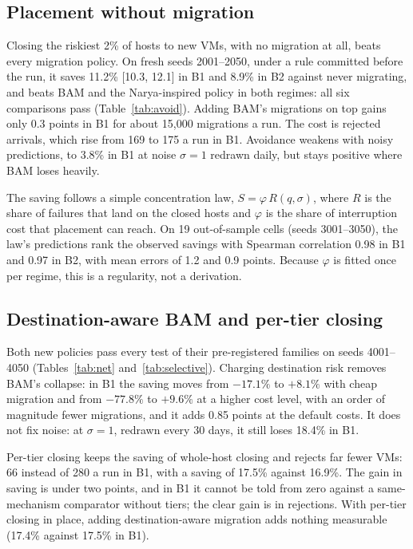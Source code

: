 \documentclass[pdflatex,sn-mathphys-num,iicol]{sn-jnl}
\theoremstyle{thmstyleone}%
\theoremstyle{thmstylethree}%
\begin{document}


\subsection{Placement without migration}\label{sec:res-avoid}

Closing the riskiest 2\% of hosts to new VMs, with no migration at all, beats every migration
policy. On fresh seeds 2001--2050, under a rule committed before the run, it saves 11.2\%
[10.3, 12.1] in B1 and 8.9\% in B2 against never migrating, and beats BAM and the Narya-inspired
policy in both regimes: all six comparisons pass (Table~\ref{tab:avoid}). Adding BAM's migrations
on top gains only 0.3 points in B1 for about 15{,}000 migrations a run. The cost is rejected
arrivals, which rise from 169 to 175 a run in B1. Avoidance weakens with noisy predictions, to
3.8\% in B1 at noise $\sigma = 1$ redrawn daily, but stays positive where BAM loses heavily.

The saving follows a simple concentration law, $S = \varphi\, R(q, \sigma)$, where $R$ is the share of
failures that land on the closed hosts and $\varphi$ is the share of interruption cost that placement
can reach. On 19 out-of-sample cells (seeds 3001--3050), the law's predictions rank the observed
savings with Spearman correlation 0.98 in B1 and 0.97 in B2, with mean errors of 1.2 and 0.9
points. Because $\varphi$ is fitted once per regime, this is a regularity, not a derivation.



\subsection{Destination-aware BAM and per-tier closing}\label{sec:res-new}

Both new policies pass every test of their pre-registered families on seeds 4001--4050
(Tables~\ref{tab:net} and~\ref{tab:selective}). Charging destination risk removes BAM's collapse:
in B1 the saving moves from $-17.1\%$ to $+8.1\%$ with cheap migration and from $-77.8\%$ to
$+9.6\%$ at a higher cost level, with an order of magnitude fewer migrations, and it adds
0.85 points at the default costs. It does not fix noise: at $\sigma = 1$, redrawn every 30 days, it
still loses 18.4\% in B1.

Per-tier closing keeps the saving of whole-host closing and rejects far fewer VMs: 66 instead of
280 a run in B1, with a saving of 17.5\% against 16.9\%. The gain in saving is under two points, and
in B1 it cannot be told from zero against a same-mechanism comparator without tiers; the clear gain
is in rejections. With per-tier closing in place, adding destination-aware migration adds nothing
measurable (17.4\% against 17.5\% in B1).
\end{document}
